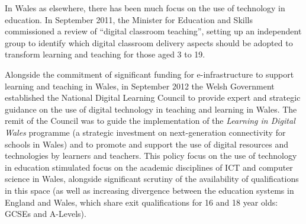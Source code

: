 \documentclass{sig-alternate}
\begin{document}


In Wales as elsewhere, there has been much focus on the use of
technology in education. In September 2011, the Minister for Education
and Skills commissioned a review of ``digital classroom teaching'',
setting up an independent group to identify which digital classroom
delivery aspects should be adopted to transform learning and teaching
for those aged 3 to 19.


Alongside the commitment of significant funding for e-infrastructure
to support learning and teaching in Wales, in September 2012 the Welsh
Government established the National Digital Learning Council to
provide expert and strategic guidance on the use of digital technology
in teaching and learning in Wales.  The remit of the Council was to
guide the implementation of the {\emph{Learning in Digital Wales}}
programme (a strategic investment on next-generation connectivity for
schools in Wales) and to promote and support the use of digital
resources and technologies by learners and teachers. This policy focus
on the use of technology in education stimulated focus on the academic
disciplines of ICT and computer science in Wales, alongside
significant scrutiny of the availability of
qualifications~\cite{raeng-comp-quals:2012} in this space (as well as
increasing divergence between the education systems in England and
Wales, which share exit qualifications for 16 and 18 year olds: GCSEs
and A-Levels).
\end{document}
